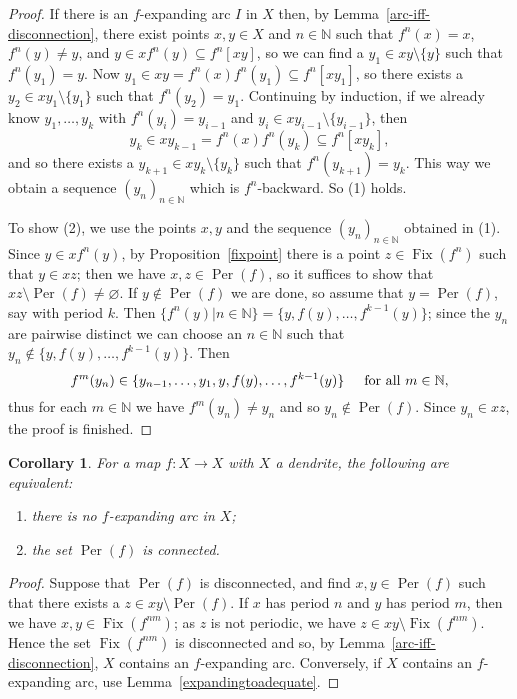 \documentclass[12pt]{amsart}
\newtheorem{corollary}[theorem]{Corollary}
\theoremstyle{definition}
\numberwithin{equation}{section}
\DeclareMathOperator{\fix}{Fix}
\DeclareMathOperator{\per}{Per}
\begin{document}
\begin{proof}
If there is an $f$-expanding arc $I$ in $X$ then, by Lemma~\ref{arc-iff-disconnection}, there exist points $x,y\in X$ and  $n\in\mathbb N$ such that $f^n(x)=x$, $f^n(y)\neq y$, and $y\in x f^n(y)\subseteq f^n[xy]$, so we can find a $y_1\in xy\setminus\{y\}$ such that $f^n(y_1)=y$. Now $y_1\in xy=f^n(x)f^n(y_1)\subseteq f^n[xy_1]$, so there exists a $y_2\in xy_1\setminus\{y_1\}$ such that $f^n(y_2)=y_1$. Continuing by induction, if we already know $y_1,\ldots,y_k$ with $f^n(y_i)=y_{i-1}$ and $y_i\in xy_{i-1}\setminus\{y_{i-1}\}$, then 
$$
y_k\in xy_{k-1}=f^n(x)f^n(y_k)\subseteq f^n[xy_k],
$$ 
and so there exists a $y_{k+1}\in xy_k\setminus\{y_k\}$ such that $f^n(y_{k+1})=y_k$. This way we obtain a sequence $(y_n)_{n\in\mathbb N}$ which is $f^n$-backward. So (1) holds.

To show (2), we use the points $x,y$ and the sequence $(y_n)_{n\in\mathbb N}$ obtained in (1). Since 
$y\in x f^n(y)$, by Proposition~\ref{fixpoint} there is a point $z\in\fix(f^n)$ such that $y\in xz$; then we have 
$x,z\in\per(f)$, so it suffices to show that $xz\setminus\per(f)\neq\varnothing$. If $y\notin\per(f)$ we are done, so assume that $y=\per(f)$, say with period $k$. Then $\{f^n(y)\big|n\in\mathbb N\}=\{y,f(y),\ldots,f^{k-1}(y)\}$; since 
the $y_n$ are pairwise distinct we can choose an $n\in\mathbb N$ such that $y_n\notin\{y,f(y),\ldots,f^{k-1}(y)\}$. Then 
$$
f^m(y_n)\in\{y_{n-1},\ldots,y_1,y,f(y),\ldots,f^{k-1}(y)\} \hspace{.5cm} \mbox{for all } m\in\mathbb N,
$$ 
\noindent thus for each $m\in\mathbb N$ we have $f^m(y_n)\neq y_n$ and so $y_n\notin\per(f)$. Since $y_n\in xz$, 
the proof is finished.
\end{proof}

\begin{corollary}\label{connectednessofper}
For a map $f \colon X\longrightarrow X$ with $X$ a dendrite, the following are equivalent:
\begin{enumerate}
\item[\emph{(e)}] there is no $f$-expanding arc in $X$;
\item[\emph{(g)}]  the set $\per(f)$ is connected.
\end{enumerate}
\end{corollary}

\begin{proof}
Suppose that $\per(f)$ is disconnected, and find $x,y\in\per(f)$ such that there exists a $z\in xy\setminus\per(f)$. If $x$ has period $n$ and $y$ has period $m$, then we have $x,y\in\fix(f^{nm})$; as $z$ is not periodic, we have
 $z\in xy\setminus\fix(f^{nm})$. Hence the set $\fix(f^{nm})$ is disconnected and so, by 
 Lemma~\ref{arc-iff-disconnection}, $X$ contains an $f$-expanding arc. Conversely, if $X$ contains an 
 $f$-expanding arc, use Lemma~\ref{expandingtoadequate}.
\end{proof}
\end{document}
